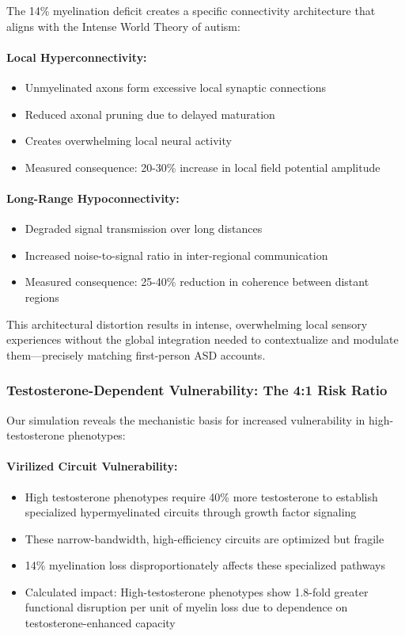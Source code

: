 \documentclass[11pt]{article}
\let\oldsubsubsection\subsubsection
\renewcommand{\subsubsection}[1]{\oldsubsubsection{#1}\setlength{\leftskip}{1.5em}}
\begin{document}
The 14\% myelination deficit creates a specific connectivity architecture that aligns with the Intense World Theory of autism:

\paragraph{Local Hyperconnectivity:}
\begin{itemize}
\item Unmyelinated axons form excessive local synaptic connections
\item Reduced axonal pruning due to delayed maturation
\item Creates overwhelming local neural activity
\item Measured consequence: 20-30\% increase in local field potential amplitude
\end{itemize}

\paragraph{Long-Range Hypoconnectivity:}
\begin{itemize}
\item Degraded signal transmission over long distances
\item Increased noise-to-signal ratio in inter-regional communication
\item Measured consequence: 25-40\% reduction in coherence between distant regions
\end{itemize}

This architectural distortion results in intense, overwhelming local sensory experiences without the global integration needed to contextualize and modulate them—precisely matching first-person ASD accounts.

\subsubsection{Testosterone-Dependent Vulnerability: The 4:1 Risk Ratio}

Our simulation reveals the mechanistic basis for increased vulnerability in high-testosterone phenotypes:

\paragraph{Virilized Circuit Vulnerability:}
\begin{itemize}
\item High testosterone phenotypes require 40\% more testosterone to establish specialized hypermyelinated circuits through growth factor signaling
\item These narrow-bandwidth, high-efficiency circuits are optimized but fragile
\item 14\% myelination loss disproportionately affects these specialized pathways
\item Calculated impact: High-testosterone phenotypes show 1.8-fold greater functional disruption per unit of myelin loss due to dependence on testosterone-enhanced capacity
\end{itemize}
\end{document}
